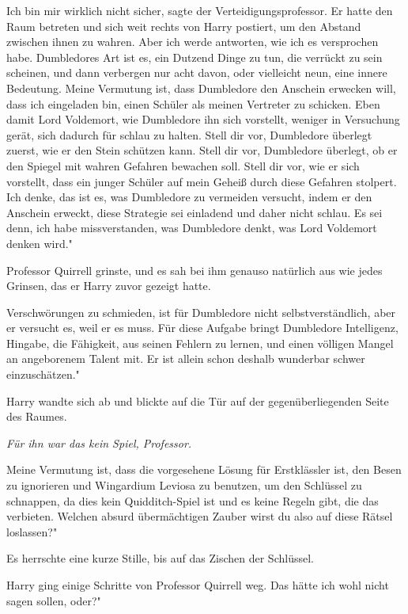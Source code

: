 \glqq Ich bin mir wirklich nicht sicher\grqq{}, sagte der
Verteidigungsprofessor. Er hatte den Raum betreten und sich weit rechts von
Harry postiert, um den Abstand zwischen ihnen zu wahren. \glqq Aber ich werde
antworten, wie ich es versprochen habe. Dumbledores Art ist es, ein Dutzend
Dinge zu tun, die verrückt zu sein scheinen, und dann verbergen nur acht davon,
oder vielleicht neun, eine innere Bedeutung. Meine Vermutung ist, dass
Dumbledore den Anschein erwecken will, dass ich eingeladen bin, einen Schüler
als meinen Vertreter zu schicken. Eben damit Lord Voldemort, wie Dumbledore ihn
sich vorstellt, weniger in Versuchung gerät, sich dadurch für schlau zu halten.
Stell dir vor, Dumbledore überlegt zuerst, wie er den Stein schützen kann. Stell
dir vor, Dumbledore überlegt, ob er den Spiegel mit wahren Gefahren bewachen
soll. Stell dir vor, wie er sich vorstellt, dass ein junger Schüler auf mein
Geheiß durch diese Gefahren stolpert. Ich denke, das ist es, was Dumbledore zu
vermeiden versucht, indem er den Anschein erweckt, diese Strategie sei einladend
und daher nicht schlau. Es sei denn, ich habe missverstanden, was Dumbledore
denkt, was Lord Voldemort denken wird."

Professor Quirrell grinste, und es sah bei ihm genauso natürlich aus wie jedes
Grinsen, das er Harry zuvor gezeigt hatte.

\glqq Verschwörungen zu schmieden, ist für Dumbledore nicht selbstverständlich,
aber er versucht es, weil er es muss. Für diese Aufgabe bringt Dumbledore
Intelligenz, Hingabe, die Fähigkeit, aus seinen Fehlern zu lernen, und einen
völligen Mangel an angeborenem Talent mit. Er ist allein schon deshalb wunderbar
schwer einzuschätzen."

Harry wandte sich ab und blickte auf die Tür auf der gegenüberliegenden Seite
des Raumes.

\emph{Für ihn war das kein Spiel, Professor.}

\glqq Meine Vermutung ist, dass die vorgesehene Lösung für Erstklässler ist, den
Besen zu ignorieren und Wingardium Leviosa zu benutzen, um den Schlüssel zu
schnappen, da dies kein Quidditch-Spiel ist und es keine Regeln gibt, die das
verbieten. Welchen absurd übermächtigen Zauber wirst du also auf diese Rätsel
loslassen?"

Es herrschte eine kurze Stille, bis auf das Zischen der Schlüssel.

Harry ging einige Schritte von Professor Quirrell weg. \glqq Das hätte ich wohl
nicht sagen sollen, oder?"

